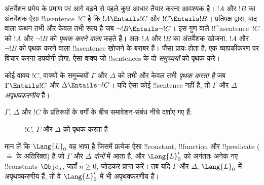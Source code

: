 \documentclass[../../../include/open-logic-section]{subfiles}
\begin{document}


अंतर्वेशन प्रमेय के प्रमाण पर आगे बढ़ने से पहले कुछ आधार तैयार करना
आवश्यक है। $!A$ और $!B$ का अंतर्वेशक ऐसा !!a{sentence}~$!C$ है कि
$!A \Entails !C$ और $!C \Entails !B$। प्रतिपक्ष द्वारा, बाद वाला कथन
तभी और केवल तभी सत्य है जब $\lnot !B \Entails \lnot
!C$। इस गुण वाले
!!^a{sentence}~$!C$ को $!A$ और $\lnot !B$ को \emph{पृथक करने वाला}
कहते हैं। अतः $!A$ और $!B$ का अंतर्वेशक खोजना, $!A$ और $\lnot !B$ को
पृथक करने वाला !!a{sentence} खोजने के बराबर है। जैसा प्रायः होता है,
एक व्यापकीकरण पर विचार करना उपयोगी होगा: ऐसा वाक्य जो !!{sentence}s के
दो \emph{समुच्चयों} को पृथक करे।

\begin{defn}
कोई वाक्य $!C$, वाक्यों के समुच्चयों $\Gamma$ और $\Delta$ को तभी और केवल
तभी \emph{पृथक करता है} जब $\Gamma \Entails !C$ और $\Delta \Entails
\lnot !C$। यदि ऐसा कोई !!{sentence} नहीं है, तो $\Gamma$ और $\Delta$
\emph{अपृथक्करणीय} हैं।
\end{defn}

$\Gamma$, $\Delta$ और $!C$ के प्रतिरूपों के वर्गों के बीच समावेशन-संबंध
नीचे दर्शाए गए हैं:
\begin{figure}[h]
  \centering
  \caption{$!C$, $\Gamma$ और $\Delta$ को पृथक करता है}
\end{figure}


\begin{lem}
मान लें कि $\Lang{L}_0$ वह भाषा है जिसमें प्रत्येक ऐसा !!{constant},
!!{function} और !!{predicate} ($\doteq$ के अतिरिक्त) है जो $\Gamma$ और
$\Delta$ \emph{दोनों} में आता है, और $\Lang{L}'_0$ को अनंततः अनेक नए
!!{constant}s $\Obj c_n$, जहाँ $n
\ge 0$, जोड़कर प्राप्त करें। तब यदि $\Gamma$ और $\Delta$,
$\Lang{L}_0$ में अपृथक्करणीय हैं,
तो वे $\Lang{L}'_0$ में भी अपृथक्करणीय हैं।
\end{lem}
\end{document}
